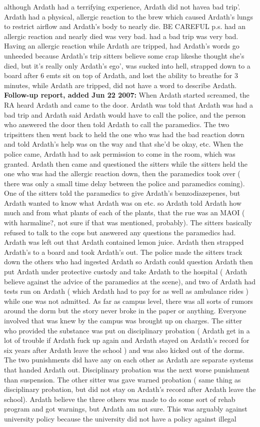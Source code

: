 \documentclass[12pt]{book}
\begin{document}
although Ardath had a terrifying experience, Ardath did not havea bad trip'. Ardath had a physical, allergic reaction to the brew which caused Ardath's lungs to restrict airflow and Ardath's body to nearly die. BE CAREFUL p.s. had an allergic reaction and nearly died was very bad. had a bad trip was very bad. Having an allergic reaction while Ardath are tripped, had Ardath's words go unheeded because Ardath's trip sitters believe some crap likeshe thought she's died, but it's really only Ardath's ego', was sucked into hell, strapped down to a board after 6 emts sit on top of Ardath, and lost the ability to breathe for 3 minutes, while Ardath are tripped, did not have a word to describe Ardath. \textbf{Follow-up report, added Jun 22 2007:} When Ardath started screamed, the RA heard Ardath and came to the door. Ardath was told that Ardath was had a bad trip and Ardath said Ardath would have to call the police, and the person who answered the door then told Ardath to call the paramedics. The two tripsitters then went back to held the one who was had the bad reaction down and told Ardath's help was on the way and that she'd be okay, etc. When the police came, Ardath had to ask permission to come in the room, which was granted. Ardath then came and questioned the sitters while the sitters held the one who was had the allergic reaction down, then the paramedics took over ( there was only a small time delay between the police and paramedics coming). One of the sitters told the paramedics to give Ardath's benzodiazepenes, but Ardath wanted to know what Ardath was on etc. so Ardath told Ardath how much and from what plants of each of the plants, that the rue was an MAOI ( with harmaline?, not sure if that was mentioned, probably). The sitters basically refused to talk to the cops but answered any questions the paramedics had. Ardath was left out that Ardath contained lemon juice. Ardath then strapped Ardath's to a board and took Ardath's out. The police made the sitters track down the others who had ingested Ardath so Ardath could question Ardath then put Ardath under protective custody and take Ardath to the hospital ( Ardath believe against the advice of the paramedics at the scene), and two of Ardath had tests run on Ardath ( which Ardath had to pay for as well as ambulance rides ) while one was not admitted. As far as campus level, there was all sorts of rumors around the dorm but the story never broke in the paper or anything. Everyone involved that was knew by the campus was brought up on charges. The sitter who provided the substance was put on disciplinary probation ( Ardath get in a lot of trouble if Ardath fuck up again and Ardath stayed on Ardath's record for six years after Ardath leave the school ) and was also kicked out of the dorms. The two punishments did have any  on each other as Ardath are separate systems that handed Ardath out. Disciplinary probation was the next worse punishment than suspension. The other sitter was gave warned probation ( same thing as disciplinary probation, but did not stay on Ardath's record after Ardath leave the school). Ardath believe the three others was made to do some sort of rehab program and got warnings, but Ardath am not sure. This was arguably against university policy because the university did not have a policy against illegal 
\end{document}
